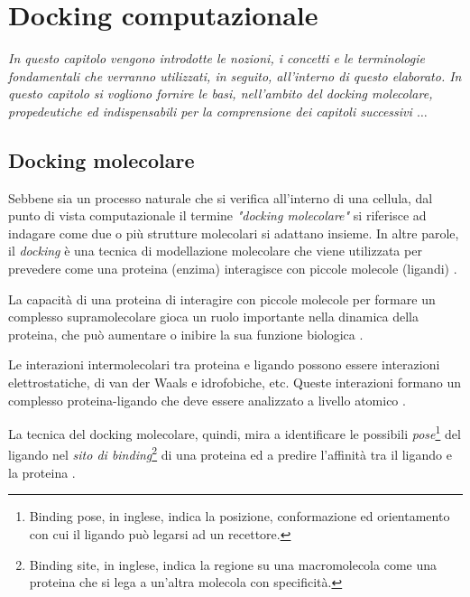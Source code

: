 


\chapter{Docking computazionale}
\textit{In questo capitolo vengono introdotte le nozioni, i concetti e le terminologie fondamentali che verranno utilizzati, in seguito, all'interno di questo elaborato.
In questo capitolo si vogliono fornire le basi, nell'ambito
del docking molecolare, propedeutiche ed
indispensabili per la comprensione dei capitoli successivi $\ldots$}

\vskip 1cm
\section{Docking molecolare} \label{docking_molecolare}
Sebbene sia un processo naturale che si verifica all'interno di una cellula, dal punto di vista computazionale il termine \textit{"docking molecolare"} si riferisce ad indagare come due o più strutture molecolari si adattano insieme.
In altre parole, il \textit{docking} è una tecnica di modellazione molecolare che viene utilizzata per prevedere come una proteina (enzima) interagisce con piccole molecole (ligandi) \cite{roy_chapter_2015}.

La capacità di una proteina di interagire con piccole molecole per formare un complesso supramolecolare gioca un ruolo importante nella dinamica della proteina, che può aumentare o inibire la sua funzione biologica \cite{roy_chapter_2015}.

Le interazioni intermolecolari tra proteina e ligando possono essere interazioni elettrostatiche, di van der Waals e idrofobiche, etc. Queste interazioni formano un complesso proteina-ligando che deve essere analizzato a livello atomico \cite{naqvi_advancements_nodate}.

La tecnica del docking molecolare, quindi, mira a identificare le possibili \textit{pose}\footnote{Binding pose, in inglese, indica la posizione, conformazione ed orientamento con cui il ligando può legarsi ad un recettore.} del ligando nel \textit{sito di binding}\footnote{Binding site, in inglese, indica la regione su una macromolecola come una proteina che si lega a un'altra molecola con specificità.} di una proteina ed a predire l'affinità tra il ligando e la proteina \cite{roy_chapter_2015}.

